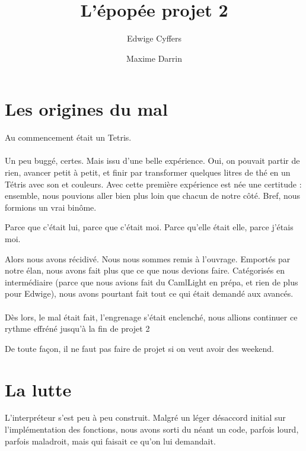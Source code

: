 \documentclass{article}
\title{L'épopée projet 2}
\author{Edwige Cyffers \and Maxime Darrin}
\date{}
\begin{document}
\maketitle
\tableofcontents

\newpage

\section{Les origines du mal}

	Au commencement était un Tetris.
	
	\paragraph{}
	Un peu buggé, certes. Mais issu d'une belle expérience. Oui, on pouvait partir de rien, avancer petit à petit, et finir par transformer quelques litres de thé en un Tétris avec son et couleurs. Avec cette première expérience est née une certitude : ensemble, nous pouvions aller bien plus loin que chacun de notre côté. Bref, nous formions un vrai binôme.
	
	Parce que c'était lui, parce que c'était moi.		
	Parce qu'elle était elle, parce j'étais moi.
	
	Alors nous avons récidivé. Nous nous sommes remis à l'ouvrage. Emportés par notre élan, nous avons fait plus que ce que nous devions faire. Catégorisés en intermédiaire (parce que nous avions fait du CamlLight en prépa, et rien de plus pour Edwige), nous avons pourtant fait tout ce qui était demandé aux avancés.	
	
	\paragraph{}
	Dès lors, le mal était fait, l'engrenage s'était enclenché, nous allions continuer ce rythme effréné jusqu'à la fin de projet 2
	
	De toute façon, il ne faut pas faire de projet si on veut avoir des weekend.
	

\section{La lutte}

	
	L'interpréteur s'est peu à peu construit. Malgré un léger désaccord initial sur l'implémentation des fonctions, nous avons sorti du néant un code, parfois lourd, parfois maladroit, mais qui faisait ce qu'on lui demandait.
	
\end{document}
